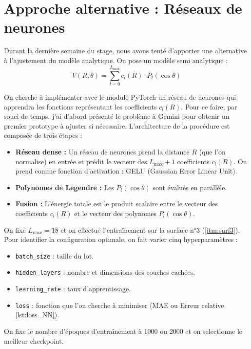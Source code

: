 \documentclass[11pt, a4paper, openany]{report}
\begin{document}
\section{Approche alternative : Réseaux de neurones}

\noindent Durant la dernière semaine du stage, nous avons tenté d'apporter une
alternative à l'ajustement du modèle analytique. On pose un modèle semi analytique : 
$$V(R, \theta) = \sum\limits_{l=0}^{L_{\max}} c_l(R) \cdot P_l(\cos\theta)$$

\noindent On cherche à implémenter avec le module PyTorch un réseau de neurones qui 
apprendra les fonctions représentant les coefficients $c_{l}(R)$. Pour ce
faire, par souci de temps, j'ai d'abord présenté le problème à Gemini pour obtenir 
un premier prototype à ajuster si nécessaire. L'architecture de la procédure est
composée de trois étapes :
\begin{itemize}
  \item \textbf{Réseau dense :} Un réseau de neurones prend la distance $R$ 
    (que l'on normalise) en entrée et prédit le vecteur des $L_{\max} + 1$ 
    coefficients $c_l(R)$. On prend comme fonction d'activation : GELU (Gaussian
    Error Linear Unit).
  \item \textbf{Polynomes de Legendre :} Les $P_l(\cos \theta)$ sont évalués
    en parallèle.
  \item \textbf{Fusion :} L'énergie totale est le produit scalaire entre le vecteur des coefficients
    $c_l(R)$ et le vecteur des polynomes $P_l(\cos \theta)$.
\end{itemize}

\qquad

\noindent On fixe $L_{max}=18$ et on effectue l'entraînement sur la surface n°3
(\ref{itm:surf3}). Pour identifier la 
configuration optimale, on fait varier cinq hyperparamètres :

\begin{itemize}
  \item \verb|batch_size| : taille du lot.
  \item \verb|hidden_layers| : nombre et dimensions des couches cachées.
  \item \verb|learning_rate| : taux d'apprentissage.
  \item \verb|loss| : fonction que l'on cherche à minimiser (MAE ou Erreur 
    relative \ref{lst:loss_NN}).
\end{itemize}

\noindent On fixe le nombre d'époques d'entraînement à 1000 ou 2000 et on selectionne le
meilleur checkpoint.
\end{document}
